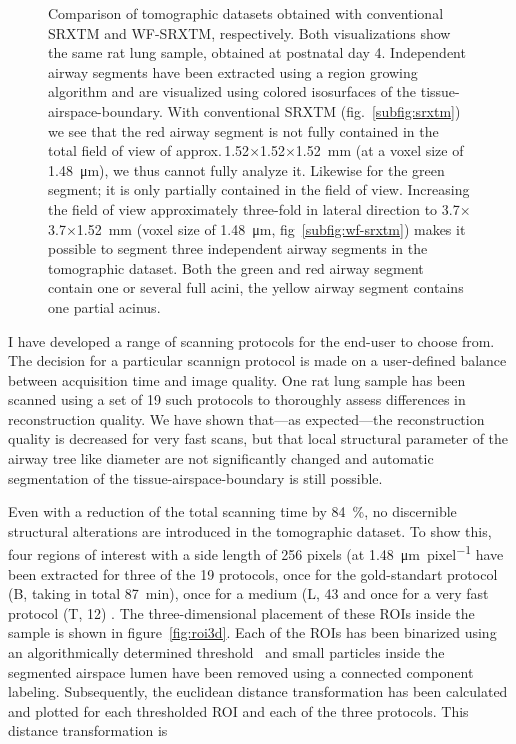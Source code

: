 \documentclass[a4paper,twoside,DIV=calc]{scrartcl}
\newlength\imagescale
\begin{document}
\begin{figure}
{%
		\label{subfig:wf-srxtm}%
		}%
	\caption{Comparison of tomographic datasets obtained with conventional SRXTM and WF-SRXTM, respectively. Both visualizations show the same rat lung sample, obtained at postnatal day 4. Independent airway segments have been extracted using a region growing algorithm and are visualized using colored isosurfaces of the tissue-airspace-boundary. With conventional SRXTM (fig.~\ref{subfig:srxtm}) we see that the red airway segment is not fully contained in the total field of view of approx.\,1.52$\times$1.52$\times$\SI{1.52}{\milli\meter} (at a voxel size of \SI{1.48}{\micro\meter}), we thus cannot fully analyze it. Likewise for the green segment; it is only partially contained in the field of view. Increasing the field of view approximately three-fold in lateral direction to 3.7$\times$3.7$\times$\SI{1.52}{\milli\meter} %
(voxel size of \SI{1.48}{\micro\meter}, fig~\ref{subfig:wf-srxtm}) makes it possible to segment three independent airway segments in the tomographic dataset. Both the green and red airway segment contain one or several full acini, the yellow airway segment contains one partial acinus.%
}%
\label{fig:wfs-overview}%
\end{figure}

I have developed a range of scanning protocols for the end-user to choose from. The decision for a particular scannign protocol is made on a user-defined balance between acquisition time and image quality. One rat lung sample has been scanned using a set of 19 such protocols to thoroughly assess differences in reconstruction quality. We have shown that---as expected---the reconstruction quality is decreased for very fast scans, but that local structural parameter of the airway tree like diameter are not significantly changed and automatic segmentation of the tissue-airspace-boundary is still possible.

Even with a reduction of the total scanning time by \SI{84}{\percent}, no discernible structural alterations are introduced in the tomographic dataset. To show this, four regions of interest with a side length of 256 pixels (at \SI{1.48}{\micro\meter\per pixel} have been extracted for three of the 19 protocols, once for the gold-standart protocol (B, taking in total \SI{87}{\minute}), once for a medium (L, \SI{43}{\min} and once for a very fast protocol (T, \SI{12}{\min}) . The three-dimensional placement of these ROIs inside the sample is shown in figure~\ref{fig:roi3d}. Each of the ROIs has been binarized using an algorithmically determined threshold~\cite{Otsu1979} and small particles inside the segmented airspace lumen have been removed using a connected component labeling. Subsequently, the euclidean distance transformation has been calculated and plotted for each thresholded ROI and each of the three protocols. This distance transformation is 
\end{document}
